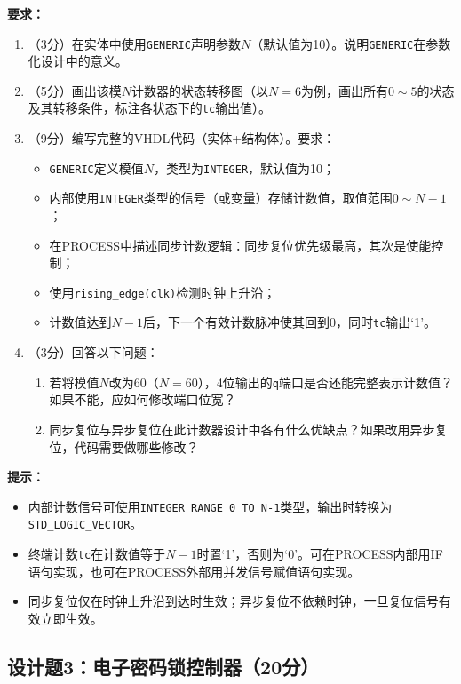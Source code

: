 \textbf{要求：}
\begin{enumerate}[label=(\arabic*)]
  \item （3分）在实体中使用\texttt{GENERIC}声明参数$N$（默认值为10）。说明\texttt{GENERIC}在参数化设计中的意义。
  \item （5分）画出该模$N$计数器的状态转移图（以$N=6$为例，画出所有$0 \sim 5$的状态及其转移条件，标注各状态下的\texttt{tc}输出值）。
  \item （9分）编写完整的VHDL代码（实体+结构体）。要求：
  \begin{itemize}
    \item \texttt{GENERIC}定义模值$N$，类型为\texttt{INTEGER}，默认值为10；
    \item 内部使用\texttt{INTEGER}类型的信号（或变量）存储计数值，取值范围$0 \sim N-1$；
    \item 在PROCESS中描述同步计数逻辑：同步复位优先级最高，其次是使能控制；
    \item 使用\texttt{rising\_edge(clk)}检测时钟上升沿；
    \item 计数值达到$N-1$后，下一个有效计数脉冲使其回到0，同时\texttt{tc}输出`1'。
  \end{itemize}
  \item （3分）回答以下问题：
  \begin{enumerate}
    \item 若将模值$N$改为60（$N=60$），4位输出的\texttt{q}端口是否还能完整表示计数值？如果不能，应如何修改端口位宽？
    \item 同步复位与异步复位在此计数器设计中各有什么优缺点？如果改用异步复位，代码需要做哪些修改？
  \end{enumerate}
\end{enumerate}

\begin{framed}
\textbf{提示：}
\begin{itemize}
  \item 内部计数信号可使用\texttt{INTEGER RANGE 0 TO N-1}类型，输出时转换为\texttt{STD\_LOGIC\_VECTOR}。
  \item 终端计数\texttt{tc}在计数值等于$N-1$时置`1'，否则为`0'。可在PROCESS内部用IF语句实现，也可在PROCESS外部用并发信号赋值语句实现。
  \item 同步复位仅在时钟上升沿到达时生效；异步复位不依赖时钟，一旦复位信号有效立即生效。
\end{itemize}
\end{framed}

\newpage

\subsection*{设计题3：电子密码锁控制器（20分）}

